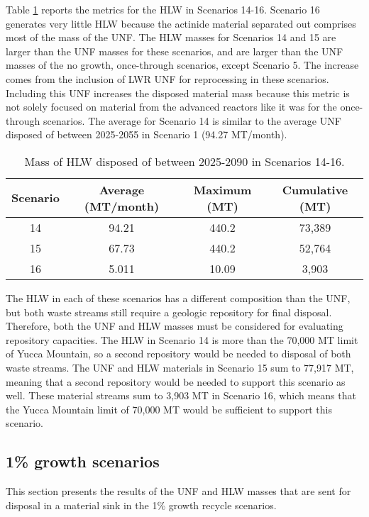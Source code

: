 Table \ref{tab:s14-16_hlw} reports the metrics for the \gls{HLW} 
in Scenarios 14-16. Scenario 16 generates very little 
\gls{HLW} because the actinide material separated out 
comprises most of the mass of the \gls{UNF}. The \gls{HLW} 
masses for Scenarios 14 and 15 are larger than the \gls{UNF} 
masses for these scenarios, and are larger than the \gls{UNF} 
masses of the no growth, once-through scenarios, except 
Scenario 5. The increase 
comes from the inclusion of \gls{LWR} \gls{UNF} for reprocessing 
in these scenarios. Including this \gls{UNF} increases the 
disposed material mass because this metric is not solely focused 
on material from the advanced reactors like it was for 
the once-through scenarios. The average for 
Scenario 14 is similar to the average \gls{UNF} disposed of 
between 2025-2055 in Scenario 1 (94.27 MT/month). 

\begin{table}[h!]
    \centering 
    \caption{Mass of HLW disposed of between 2025-2090 in 
    Scenarios 14-16.}
    \label{tab:s14-16_hlw}
    \begin{tabular}{c c c c}
        \hline 
        Scenario & Average (MT/month) & Maximum (MT) & Cumulative (MT) \\
        \hline
        14 & 94.21 & 440.2 & 73,389\\
        15 & 67.73 & 440.2 & 52,764\\
        16 & 5.011 & 10.09 & 3,903\\
        \hline
    \end{tabular}
\end{table}

The \gls{HLW} in each of these scenarios has a different 
composition than the \gls{UNF}, but both waste streams 
still require a geologic repository for final 
disposal. Therefore, both the \gls{UNF} and \gls{HLW} 
masses must be considered for evaluating repository 
capacities. The \gls{HLW} in Scenario 14 is more than 
the 70,000 MT limit of Yucca Mountain, so a second 
repository would be needed to disposal of both waste 
streams. The \gls{UNF} and \gls{HLW} materials in 
Scenario 15 sum to 77,917 MT, meaning that a second 
repository would be needed to support this scenario 
as well. These material streams sum to 3,903 MT in 
Scenario 16, which means that the Yucca Mountain 
limit of 70,000 MT would be sufficient to support this 
scenario. 


\subsection{1\% growth scenarios}
This section presents the results of the \gls{UNF} and 
\gls{HLW} masses that are sent for disposal in a 
material sink in the 1\% growth recycle scenarios. 

